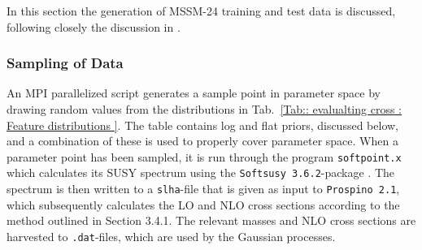 \documentclass[twoside,english]{uiofysmaster}
\begin{document}
In this section the generation of MSSM-24 training and test data is discussed, following closely the discussion in \cite{sparre2018fast}. 

\subsubsection{Sampling of Data}

An MPI parallelized script generates a sample point in parameter space by drawing random values from the distributions in Tab.~\ref{Tab:: evalualting cross : Feature distributions }. The table contains log and flat priors, discussed below, and a combination of these is used to properly cover parameter space. When a parameter point has been sampled, it is run through the program \verb|softpoint.x| which calculates its SUSY spectrum using the \verb|Softsusy 3.6.2|-package \cite{ALLANACH2002305}. The spectrum is then written to a \verb|slha|-file that is given as input to \verb|Prospino 2.1|, which subsequently calculates the LO and NLO cross sections according to the method outlined in Section 3.4.1. The relevant masses and NLO cross sections are harvested to \verb|.dat|-files, which are used by the Gaussian processes. 
\end{document}
